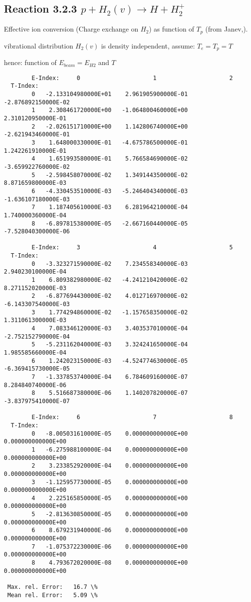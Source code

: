 \documentclass[12pt,dvipdfmx]{article}
\begin{document}
\subsection{
Reaction 3.2.3  $  p + H_2(v) \rightarrow H + H_2^+  $
}
  Effective ion conversion (Charge exchange on $H_2$)
  as function of $T_p$ (from Janev,\cite{kn:Janev}).

  vibrational distribution $H_2(v)$ is density independent, assume: $T_e = T_p = T$

  hence: function of $E_{beam} = E_{H2}$ and $T$
\begin{small}\begin{verbatim}
        E-Index:     0                     1                     2
  T-Index:
        0   -2.133104980000E+01    2.961905900000E-01   -2.876892150000E-02
        1    2.308461720000E+00   -1.064800460000E+00    2.310120950000E-01
        2   -2.026151710000E+00    1.142806740000E+00   -2.621943460000E-01
        3    1.648000330000E-01   -4.675786500000E-01    1.242261910000E-01
        4    1.651993580000E-01    5.766584690000E-02   -3.659922760000E-02
        5   -2.598458070000E-02    1.349144350000E-02    8.871659800000E-03
        6   -4.330453510000E-03   -5.246404340000E-03   -1.636107180000E-03
        7    1.187405610000E-03    6.281964210000E-04    1.740000360000E-04
        8   -6.897815380000E-05   -2.667160440000E-05   -7.528040300000E-06

        E-Index:     3                     4                     5
  T-Index:
        0   -3.323271590000E-02    7.234558340000E-03    2.940230100000E-04
        1    6.809382980000E-02   -4.241210420000E-02    8.271152020000E-03
        2   -6.877694430000E-02    4.012716970000E-02   -6.143307540000E-03
        3    1.774294860000E-02   -1.157658350000E-02    1.311061300000E-03
        4    7.083346120000E-03    3.403537010000E-04   -2.752152790000E-04
        5   -5.231162040000E-03    3.324241650000E-04    1.985585660000E-04
        6    1.242023150000E-03   -4.524774630000E-05   -6.369415730000E-05
        7   -1.337853740000E-04    6.784609160000E-07    8.284840740000E-06
        8    5.516687380000E-06    1.140207820000E-07   -3.837975410000E-07

        E-Index:     6                     7                     8
  T-Index:
        0   -8.005031610000E-05    0.000000000000E+00    0.000000000000E+00
        1   -6.275988100000E-04    0.000000000000E+00    0.000000000000E+00
        2    3.233852920000E-04    0.000000000000E+00    0.000000000000E+00
        3   -1.125957730000E-05    0.000000000000E+00    0.000000000000E+00
        4    2.225165850000E-05    0.000000000000E+00    0.000000000000E+00
        5   -2.813630850000E-05    0.000000000000E+00    0.000000000000E+00
        6    8.679231940000E-06    0.000000000000E+00    0.000000000000E+00
        7   -1.075372230000E-06    0.000000000000E+00    0.000000000000E+00
        8    4.793672020000E-08    0.000000000000E+00    0.000000000000E+00

 Max. rel. Error:   16.7 \%
 Mean rel. Error:   5.09 \%
\end{verbatim}\end{small}
\end{document}
